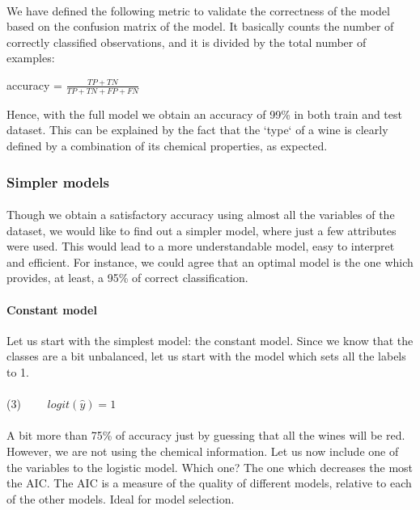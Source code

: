 \documentclass[10pt]{article}
\begin{document}
\paragraph*{}
We have defined the following metric to validate the correctness of the model based on the confusion matrix of the model. It basically counts the number of correctly classified observations, and it is divided by the total number of examples:

\begin{center}
	accuracy = $\displaystyle \frac{TP+TN}{TP+TN+FP+FN}$
\end{center}

Hence, with the full model we obtain an accuracy of 99\% in both train and test dataset. This can be explained by the fact that the `type` of a wine is clearly defined by a combination of its chemical properties, as expected.

\subsubsection{Simpler models}

\paragraph*{}
Though we obtain a satisfactory accuracy using almost all the variables of the dataset, we would like to find out a simpler model, where just a few attributes were used. This would lead to a more understandable model, easy to interpret and efficient. For instance, we could agree that an optimal model is the one which provides, at least, a 95\% of correct classification.


\paragraph{Constant model}	

Let us start with the simplest model: the constant model. Since we know that the classes are a bit unbalanced, let us start with the model which sets all the labels to 1.

\paragraph*{}
(3) \ \ \ \  $logit(\hat{y}) = 1$

\paragraph*{}
A bit more than 75\% of accuracy just by guessing that all the wines will be red. However, we are not using the chemical information. Let us now include one of the variables to the logistic model. Which one? The one which decreases the most the AIC. The AIC is a measure of the quality of different models, relative to each of the other models. Ideal for model selection.
\end{document}
